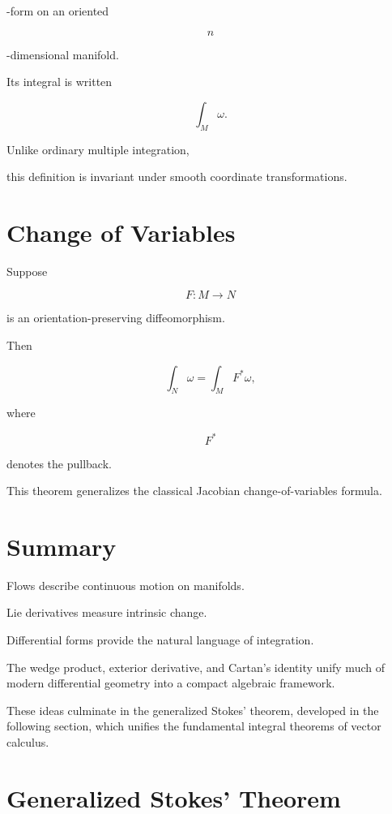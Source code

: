 \documentclass[11pt,fleqn]{book}
\numberwithin{equation}{chapter}
\theoremstyle{plain}
\theoremstyle{definition}
\theoremstyle{remark}
\begin{document}
-form on an oriented

\[
n
\]

-dimensional manifold.

Its integral is written

\[
\boxed{
\int_M\omega.
}
\]

Unlike ordinary multiple integration,

this definition is invariant under smooth coordinate transformations.


\section{Change of Variables}

Suppose

\[
F:M\rightarrow N
\]

is an orientation-preserving diffeomorphism.

Then

\[
\boxed{
\int_N\omega
=
\int_MF^*\omega,
}
\]

where

\[
F^*
\]

denotes the pullback.

This theorem generalizes the classical Jacobian change-of-variables
formula.


\section{Summary}

Flows describe continuous motion on manifolds.

Lie derivatives measure intrinsic change.

Differential forms provide the natural language of integration.

The wedge product, exterior derivative, and Cartan's identity unify much
of modern differential geometry into a compact algebraic framework.

These ideas culminate in the generalized Stokes' theorem, developed in
the following section, which unifies the fundamental integral theorems
of vector calculus.


\section{Generalized Stokes' Theorem}
\end{document}
